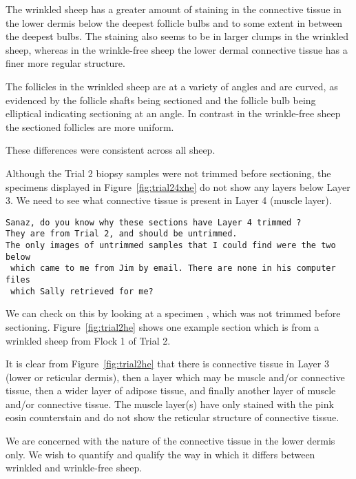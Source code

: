 \documentclass[titlepage]{article}  %
\begin{document}


The wrinkled sheep has a greater amount of staining in the  connective tissue in the lower dermis below the deepest follicle bulbs and to some extent in between the deepest bulbs. The staining also seems to be in larger clumps in the wrinkled sheep, whereas in the wrinkle-free sheep the lower dermal connective tissue has a finer more regular structure. 

  The follicles in the wrinkled sheep are at a variety of angles and are curved, as evidenced by the follicle shafts being sectioned and the follicle bulb being elliptical indicating sectioning at an angle. In contrast in the wrinkle-free sheep the sectioned follicles are more uniform. 

These differences were consistent across all sheep.

Although the Trial 2 biopsy samples were not trimmed before sectioning, the specimens displayed in Figure~\ref{fig:trial24xhe} do not show any layers below Layer 3. We need to see what connective tissue is present in Layer 4 (muscle layer). 
\begin{verbatim}
Sanaz, do you know why these sections have Layer 4 trimmed ? 
They are from Trial 2, and should be untrimmed.
The only images of untrimmed samples that I could find were the two below
 which came to me from Jim by email. There are none in his computer files
 which Sally retrieved for me?
\end{verbatim}

  We can check on this by looking at a specimen , which was not trimmed before sectioning. Figure~\ref{fig:trial2he} shows one example section which is from a wrinkled sheep from Flock 1 of Trial 2.


It is clear from Figure~\ref{fig:trial2he} that there is connective tissue in Layer 3 (lower or reticular dermis), then a layer which may be muscle and/or connective tissue, then a wider layer of adipose tissue, and finally another layer of muscle and/or connective tissue.  The muscle layer(s) have only stained with the pink eosin counterstain and do not show the reticular structure of  connective tissue. 

We are concerned with the nature of the connective tissue in the lower dermis only. We wish to quantify and qualify the way in which it differs between wrinkled and wrinkle-free sheep.
\end{document}
